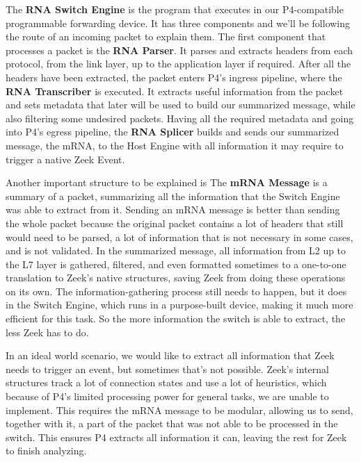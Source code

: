 The \textbf{RNA Switch Engine} is the program that executes in our P4-compatible programmable forwarding device. It has three components and we'll be following the route of an incoming packet to explain them. The first component that processes a packet is the \textbf{RNA Parser}. It parses and extracts headers from each protocol, from the link layer, up to the application layer if required. After all the headers have been extracted, the packet enters P4's ingress pipeline, where the \textbf{RNA Transcriber} is executed. It extracts useful information from the packet and sets metadata that later will be used to build our summarized message, while also filtering some undesired packets. Having all the required metadata and going into P4's egress pipeline, the \textbf{RNA Splicer} builds and sends our summarized message, the mRNA, to the Host Engine with all information it may require to trigger a native Zeek Event.

Another important structure to be explained is The \textbf{mRNA Message} is a summary of a packet, summarizing all the information that the Switch Engine was able to extract from it. Sending an mRNA message is better than sending the whole packet because the original packet contains a lot of headers that still would need to be parsed, a lot of information that is not necessary in some cases, and is not validated. In the summarized message, all information from L2 up to the L7 layer is gathered, filtered, and even formatted sometimes to a one-to-one translation to Zeek's native structures, saving Zeek from doing these operations on its own. The information-gathering process still needs to happen, but it does in the Switch Engine, which runs in a purpose-built device, making it much more efficient for this task. So the more information the switch is able to extract, the less Zeek has to do.

In an ideal world scenario, we would like to extract all information that Zeek needs to trigger an event, but sometimes that's not possible. Zeek's internal structures track a lot of connection states and use a lot of heuristics, which because of P4's limited processing power for general tasks, we are unable to implement. This requires the mRNA message to be modular, allowing us to send, together with it, a part of the packet that was not able to be processed in the switch. This ensures P4 extracts all information it can, leaving the rest for Zeek to finish analyzing.

% 
